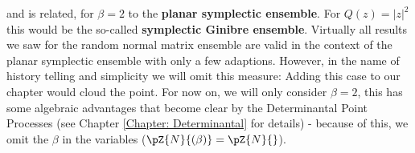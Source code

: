 and is related, for $\beta = 2$ to the \textbf{planar symplectic ensemble}. For $Q(z) = |z|^2$ this would be the so-called \textbf{symplectic Ginibre ensemble}. Virtually all results we saw for the random normal matrix ensemble are valid in the context of the planar symplectic ensemble with only a few adaptions. However, in the name of history telling and simplicity we will omit this measure: Adding this case to our chapter would cloud the point. For now on, we will only consider $\beta = 2$, this has some algebraic advantages that become clear by the Determinantal Point Processes (see Chapter \ref{Chapter: Determinantal} for details) - because of this, we omit the $\beta$ in the variables ($\pZ{N}{(\beta)} = \pZ{N}{}$).